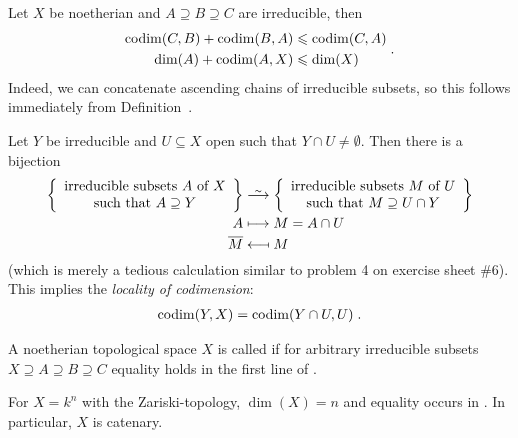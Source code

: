 \documentclass[a4paper,parskip=half,numbers=enddot, DIV=12]{scrreprt}
\renewcommand{\leq}{\leqslant}
\begin{document}
	\begin{rem}[a.k.a. Remark 5]
		\begin{alphanumerate}
			\item {}Let $X$ be noetherian and $A\supseteq B\supseteq C$ are irreducible, then
			\begin{align}\lbl{eq:codimIneqs}
			\begin{split}
			\codim(C,B) +\codim(B,A) &\leq \codim(C,A) \\
			\dim (A) + \codim(A,X) &\leq \dim (X)
			\end{split}\;.
			\end{align}
			Indeed, we can concatenate ascending chains of irreducible subsets, so this follows immediately from Definition~.
			\item Let $Y$ be irreducible and $U\subseteq X$ open such that $Y\cap U\neq\emptyset$. Then there is a bijection%
			\begin{align*}
			\left\{\begin{array}{c}
			\text{irreducible subsets }A\text{ of } X\\\text{such that }A\supseteq Y
			\end{array}\right\}&\isomorphism\left\{\begin{array}{c}
			\text{irreducible subsets }M\text{ of } U\\
			\text{such that }M\supseteq U\cap Y
			\end{array}
			\right\}\\
			A &\longmapsto M = A\cap U\\
			\overline{M}&\longmapsfrom M
			\end{align*}
			(which is merely a tedious calculation similar to problem 4 on exercise sheet \#6). This implies the \emph{locality of codimension}:
			\begin{align}\lbl{eq:localityOfCodim}
				\codim(Y,X) = \codim(Y\cap U, U) \;.
			\end{align}
		\end{alphanumerate}
	\begin{defi}
		A noetherian topological space $X$ is called  if for arbitrary irreducible subsets $X\supseteq A\supseteq B\supseteq C$ equality holds in the first line of .
	\end{defi}		
	\end{rem}
	\begin{thm}
		For $X=k^n$ with the Zariski-topology, $\dim (X) = n$ and equality occurs in . In particular, $X$ is catenary.
	\end{thm}
\end{document}
